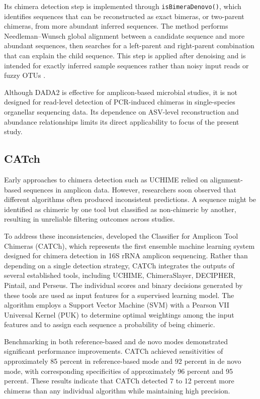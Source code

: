 Its chimera detection step is implemented through \texttt{isBimeraDenovo()}, which identifies sequences that can be reconstructed as exact bimeras, or two-parent chimeras, from more abundant inferred sequences. The method performs Needleman--Wunsch global alignment between a candidate sequence and more abundant sequences, then searches for a left-parent and right-parent combination that can explain the child sequence. This step is applied after denoising and is intended for exactly inferred sample sequences rather than noisy input reads or fuzzy OTUs \citep{Callahan2016}.

Although DADA2 is effective for amplicon-based microbial studies, it is not designed for read-level detection of PCR-induced chimeras in single-species organellar sequencing data. Its dependence on ASV-level reconstruction and abundance relationships limits its direct applicability to focus of the present study.

\subsection{CATch}
Early approaches to chimera detection such as UCHIME relied on alignment-based sequences in amplicon data. However, researchers soon observed that different algorithms often produced inconsistent predictions. A sequence might be identified as chimeric by one tool but classified as non-chimeric by another, resulting in unreliable filtering outcomes across studies.

To address these inconsistencies, \cite{Mysara2015} developed the Classifier for Amplicon Tool Chimeras (CATCh), which represents the first ensemble machine learning system designed for chimera detection in 16S rRNA amplicon sequencing. Rather than depending on a single detection strategy, CATCh integrates the outputs of several established tools, including UCHIME, ChimeraSlayer, DECIPHER, Pintail, and Perseus. The individual scores and binary decisions generated by these tools are used as input features for a supervised learning model. The algorithm employs a Support Vector Machine (SVM) with a Pearson VII Universal Kernel (PUK) to determine optimal weightings among the input features and to assign each sequence a probability of being chimeric.

Benchmarking in both reference-based and de novo modes demonstrated significant performance improvements. CATCh achieved sensitivities of approximately 85 percent in reference-based mode and 92 percent in de novo mode, with corresponding specificities of approximately 96 percent and 95 percent. These results indicate that CATCh detected 7 to 12 percent more chimeras than any individual algorithm while maintaining high precision.

